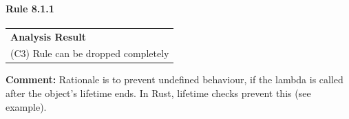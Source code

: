 \paragraph{Rule 8.1.1}
\begin{longtable}{p{13cm}}
\textbf{Analysis Result} \\
(C3) Rule can be dropped completely \\
\end{longtable}
\textbf{Comment:} Rationale is to prevent undefined behaviour, if the lambda is called after the object's lifetime ends. In Rust, lifetime checks prevent this (see example). \\


